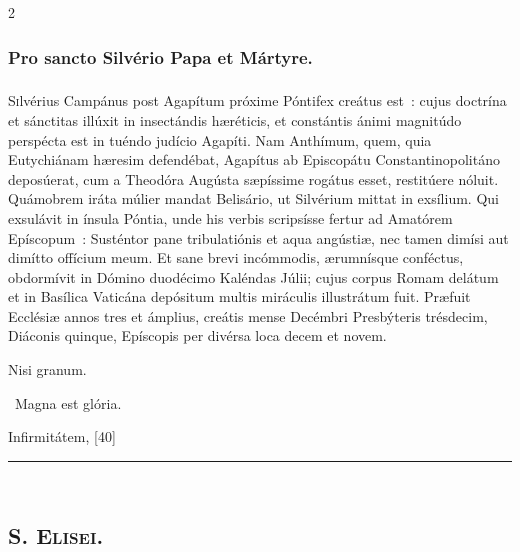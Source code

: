 \documentclass[9pt,twoside]{extarticle}
\begin{document}
\begin{multicols}{2}
\begin{tightlist}{}
\item {}
\end{tightlist}

\subsubsection*{\center Pro sancto Silvério Papa et Mártyre.}
\subsubsection*{\center {}}
\lettrine{S}ilvérius Campánus post Agapítum próxime Póntifex creátus est~: cujus doctrína et sánctitas illúxit in insectándis hæréticis, et constántis ánimi magnitúdo perspécta est in tuéndo judício Agapíti. Nam Anthímum, quem, quia Eutychiánam hæresim defendébat, Agapítus ab Episcopátu Constantinopolitáno deposúerat, cum a Theodóra Augústa sæpíssime rogátus esset, restitúere nóluit. Quámobrem iráta múlier mandat Belisário, ut Silvérium mittat in exsílium. Qui exsulávit in ínsula Póntia, unde his verbis scripsísse fertur ad Amatórem Epíscopum~: Susténtor pane tribulatiónis et aqua angústiæ, nec tamen dimísi aut dimítto offícium meum. Et sane brevi incómmodis, ærumnísque conféctus, obdormívit in Dómino duodécimo Kaléndas Júlii; cujus corpus Romam delátum et in Basílica Vaticána depósitum multis miráculis illustrátum fuit. Præfuit Ecclésiæ annos tres et ámplius, creátis mense Decémbri Presbýteris trésdecim, Diáconis quinque, Epíscopis per divérsa loca decem et novem.

\begin{tightlist}{}
\item {} Nisi granum.
\item {}~Magna est glória.
\item {} Infirmitátem,  [40]
\end{tightlist}

\begin{center}\textcolor{red}{\rule{\linewidth}{0.5pt}} \end{center}

\subsection*{\center \textsc{\\ 
S. Elisei.}}

\end{multicols}
\end{document}
